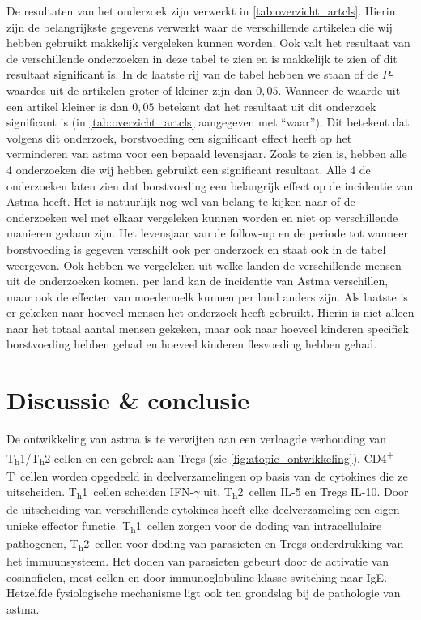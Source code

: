 \documentclass[abstract=true]{scrartcl}
\begin{document}
De resultaten van het onderzoek zijn verwerkt in \cref{tab:overzicht_artcls}. Hierin zijn de belangrijkste gegevens verwerkt waar de verschillende artikelen die wij hebben gebruikt makkelijk vergeleken kunnen worden. Ook valt het resultaat van de verschillende onderzoeken in deze tabel te zien en is makkelijk te zien of dit resultaat significant is. In de laatste rij van de tabel hebben we staan of de $P$-waardes uit de artikelen groter of kleiner zijn dan $0,05$. Wanneer de waarde uit een artikel kleiner is dan $0,05$ betekent dat het resultaat uit dit onderzoek significant is (in \cref{tab:overzicht_artcls} aangegeven met “waar”). Dit betekent dat volgens dit onderzoek, borstvoeding een significant effect heeft op het verminderen van astma voor een bepaald levensjaar. Zoals te zien is, hebben alle 4 onderzoeken die wij hebben gebruikt een significant resultaat. Alle 4 de onderzoeken laten zien dat borstvoeding een belangrijk effect op de incidentie van Astma heeft. Het is natuurlijk nog wel van belang te kijken naar of de onderzoeken wel met elkaar vergeleken kunnen worden en niet op verschillende manieren gedaan zijn. Het levensjaar van de follow-up en de periode tot wanneer borstvoeding is gegeven verschilt ook per onderzoek en staat ook in de tabel weergeven. Ook hebben we vergeleken uit welke landen de verschillende mensen uit de onderzoeken komen. per land kan de incidentie van Astma verschillen, maar ook de effecten van moedermelk kunnen per land anders zijn. Als laatste is er gekeken naar hoeveel mensen het onderzoek heeft gebruikt. Hierin is niet alleen naar het totaal aantal mensen gekeken, maar ook naar hoeveel kinderen specifiek borstvoeding hebben gehad en hoeveel kinderen flesvoeding hebben gehad. 

\section{Discussie \& conclusie}

De ontwikkeling van astma is te verwijten aan een verlaagde verhouding van T\textsubscript{h}1/T\textsubscript{h}2 cellen en een gebrek aan Tregs (zie \cref{fig:atopie_ontwikkeling}). CD4\textsuperscript{+} T~cellen worden opgedeeld in deelverzamelingen op basis van de cytokines die ze uitscheiden. T\textsubscript{h}1~cellen scheiden IFN-$\gamma$ uit, T\textsubscript{h}2~cellen IL-5 en Tregs IL-10. Door de uitscheiding van verschillende cytokines heeft elke deelverzameling een eigen unieke effector functie. T\textsubscript{h}1~cellen zorgen voor de doding van intracellulaire pathogenen, T\textsubscript{h}2~cellen voor doding van parasieten en Tregs onderdrukking van het immuunsysteem. Het doden van parasieten gebeurt door de activatie van eosinofielen, mest cellen en door immunoglobuline klasse switching naar IgE. Hetzelfde fysiologische mechanisme ligt ook ten grondslag bij de pathologie van astma.
\end{document}
